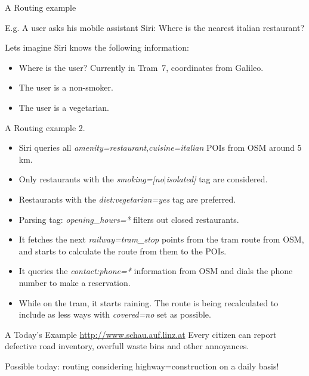 \documentclass{beamer}
\begin{document}
\begin{frame}{A Routing example}

  E.g. A user asks his mobile assistant Siri: Where is the nearest italian restaurant?

  Lets imagine Siri knows the following information:
  \begin{itemize}
    \item Where is the user? Currently in Tram~7, coordinates from Galileo.
    \item The user is a non-smoker.
    \item The user is a vegetarian.
  \end{itemize}

\end{frame}

\begin{frame}{A Routing example 2.}

  \begin{itemize}
    \item Siri queries all \emph{amenity=restaurant},\emph{cuisine=italian} POIs from OSM around 5\,km.
    \item Only restaurants with the \emph{smoking=[no$\vert$isolated]} tag are considered.
    \item Restaurants with the \emph{diet:vegetarian=yes} tag are preferred.
    \item Parsing tag: \emph{opening\_hours=*} filters out closed restaurants.
    \item It fetches the next \emph{railway=tram\_stop} points from the tram route from OSM, and starts to calculate the route from them to the POIs.
    \item It queries the \emph{contact:phone=*} information from OSM and dials the phone number to make a reservation.
      \pause
    \item While on the tram, it starts raining. The route is being recalculated to include as less ways with \emph{covered=no} set as possible.
  \end{itemize}
\end{frame}


\begin{frame}{A Today's Example}
  \url{http://www.schau.auf.linz.at}
  Every citizen can report defective road inventory, overfull waste bins and other annoyances.
  \pause
  
  Possible today: routing considering highway=construction on a daily basis!

\end{frame}
\end{document}
